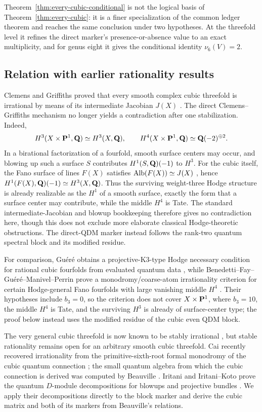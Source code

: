 Theorem~\ref{thm:every-cubic-conditional} is not the logical basis of
Theorem~\ref{thm:every-cubic}: it is a finer specialization of the common
ledger theorem and reaches the same conclusion under two hypotheses.  At the
threefold level it refines the direct marker's presence-or-absence value to an
exact multiplicity, and for genus eight it gives the conditional identity
\(\nu_6(V)=2\).

\subsection*{Relation with earlier rationality results}

Clemens and Griffiths proved that every smooth complex cubic threefold is
irrational by means of its intermediate Jacobian \(J(X)\) \cite{CG}.  The
direct
Clemens--Griffiths mechanism no longer yields a contradiction after one
stabilization.  Indeed,
\[
 H^3(X\times\mathbf P^1,\mathbf Q)\simeq H^3(X,\mathbf Q),
 \qquad
 H^4(X\times\mathbf P^1,\mathbf Q)\simeq\mathbf Q(-2)^{\oplus2}.
\]
In a birational factorization of a fourfold, smooth surface centers may
occur, and blowing up such a surface \(S\) contributes \(H^1(S,\mathbf Q)(-1)\) to
\(H^3\).  For the cubic itself, the Fano surface of lines \(F(X)\) satisfies
\(\operatorname{Alb}(F(X))\simeq J(X)\) \cite[Theorem~11.19]{CG}, hence
\(H^1(F(X),\mathbf Q)(-1)\simeq H^3(X,\mathbf Q)\).  Thus the surviving weight-three Hodge
structure is already realizable as the \(H^1\) of a smooth surface, exactly
the form that a surface center may contribute, while the middle \(H^4\) is
Tate.  The standard intermediate-Jacobian and blowup bookkeeping therefore
gives no contradiction here, though this does not exclude more elaborate
classical Hodge-theoretic obstructions.  The direct-QDM marker instead
follows the rank-two quantum spectral block and its modified residue.

For comparison, Gu\'er\'e obtains a projective-K3-type Hodge necessary
condition for rational cubic fourfolds from evaluated quantum data
\cite{Guere}, while Benedetti--Fay--Gu\'er\'e--Manivel--Perrin prove a
monodromy/coarse-atom irrationality criterion for certain Hodge-general Fano
fourfolds with large vanishing middle \(H^4\) \cite{BFGMP}.  Their
hypotheses include \(b_3=0\), so the criterion does not cover
\(X\times\mathbf P^1\), where
\(b_3=10\), the middle \(H^4\) is Tate, and the surviving \(H^3\) is
already of surface-center type; the proof below instead uses the modified
residue of the cubic even QDM block.

The
very general cubic threefold is now known to be stably irrational
\cite[Corollary~1.4]{EdGFS}, but stable rationality remains open for an
arbitrary smooth cubic threefold.  Cai recently recovered irrationality
from the primitive-sixth-root formal monodromy of the cubic quantum
connection \cite{Cai}; the small quantum algebra from which the cubic
connection is derived was computed by Beauville \cite{Beauville}.  Iritani
and Iritani--Koto prove the quantum
\(D\)-module decompositions for blowups and projective bundles
\cite{IritaniBlowup,IritaniKoto}.  We apply their decompositions directly to
the block marker and derive the cubic matrix and both of its markers from
Beauville's relations.


